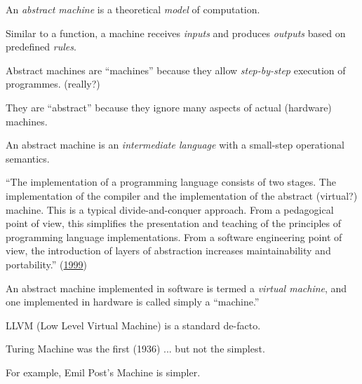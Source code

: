 \documentclass{article}
\begin{document}

\pptToc



An \emph{abstract machine} is a theoretical \emph{model} of computation.

Similar to a function, a machine receives \emph{inputs} and produces \emph{outputs} based on predefined \emph{rules}.

Abstract machines are ``machines'' because they allow \emph{step-by-step} execution of programmes. (really?)

They are ``abstract'' because they ignore many aspects of actual (hardware) machines.

An abstract machine is an \emph{intermediate language} with a small-step operational semantics.

\plush{}


``The implementation of a programming language consists of two
stages. The implementation of the compiler and the implementation of the abstract (virtual?) machine.
This is a typical divide-and-conquer approach.
From a pedagogical point of view, this simplifies the presentation and
teaching of the principles of programming language implementations.
From a software engineering point of view, the introduction of layers of
abstraction increases maintainability and portability.'' (\href{https://www.sciencedirect.com/science/article/abs/pii/S0167739X99000886}{1999})

\plush{}


An abstract machine implemented in software is termed a \emph{virtual machine},
and one implemented in hardware is called simply a ``machine.''

\plush{}


LLVM (Low Level Virtual Machine) is a standard de-facto.


\plush{}


Turing Machine was the first (1936) ... but not the simplest.


For example, Emil Post's Machine is simpler.
\end{document}

